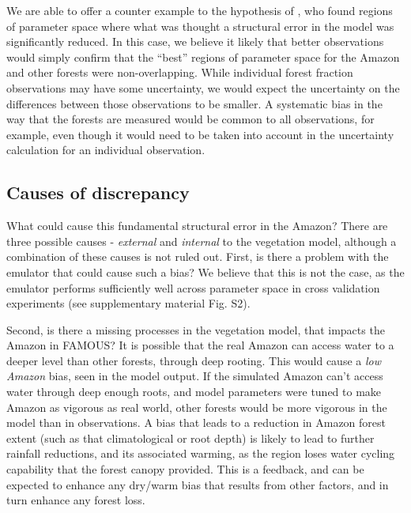 \documentclass[esd, manuscript]{copernicus}
\begin{document}
We are able to offer a counter example to the hypothesis of \cite{williamson2014identifying}, who found regions of parameter space where what was thought a structural error in the model was significantly reduced. In this case, we believe it likely that better observations would simply confirm that the ``best'' regions of parameter space for the Amazon and other forests were non-overlapping. While individual forest fraction observations may have some uncertainty, we would expect the uncertainty on the differences between those observations to be smaller. A systematic bias in the way that the forests are measured would be common to all observations, for example, even though it would need to be taken into account in the uncertainty calculation for an individual observation.

\subsection{Causes of discrepancy}\label{ssec:causes}
What could cause this fundamental structural error in the Amazon? There are three possible causes - \emph{external} and \emph{internal} to the vegetation model, although a combination of these causes is not ruled out. First, is there a problem with the emulator that could cause such a bias? We believe that this is not the case, as the emulator performs sufficiently well across parameter space in cross validation experiments (see supplementary material Fig. S2).

Second, is there a missing processes in the vegetation model, that impacts the Amazon in FAMOUS? It is possible that the real Amazon can access water to a deeper level than other forests, through deep rooting. This would cause a \emph{low Amazon} bias, seen in the model output. If the simulated Amazon can't access water through deep enough roots, and model parameters were tuned to make Amazon as vigorous as real world, other forests would be more vigorous in the model than in observations. A bias that leads to a reduction in Amazon forest extent (such as that climatological or root depth) is likely to lead to further rainfall reductions, and its associated warming, as the region loses water cycling capability that the forest canopy provided.  This is a feedback, and can be expected to enhance any dry/warm bias that results from other factors, and in turn enhance any forest loss.
\end{document}

